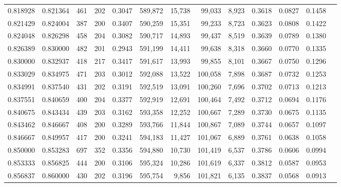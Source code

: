 \begin{tabular}{rrrrrrrrrrrrr}
0.818928 & 0.821364 &    461 &   202 &                                     0.3047 & 589,872 &  15,738 &  99,033 &   8,923 & 0.3618 & 0.0827 & 0.1458 \\
0.821429 & 0.824004 &    387 &   200 &                                     0.3407 & 590,259 &  15,351 &  99,233 &   8,723 & 0.3623 & 0.0808 & 0.1422 \\
0.824048 & 0.826298 &    458 &   204 &                                     0.3082 & 590,717 &  14,893 &  99,437 &   8,519 & 0.3639 & 0.0789 & 0.1380 \\
0.826389 & 0.830000 &    482 &   201 &                                     0.2943 & 591,199 &  14,411 &  99,638 &   8,318 & 0.3660 & 0.0770 & 0.1335 \\
0.830000 & 0.832937 &    418 &   217 &                                     0.3417 & 591,617 &  13,993 &  99,855 &   8,101 & 0.3667 & 0.0750 & 0.1296 \\
0.833029 & 0.834975 &    471 &   203 &                                     0.3012 & 592,088 &  13,522 & 100,058 &   7,898 & 0.3687 & 0.0732 & 0.1253 \\
0.834991 & 0.837540 &    431 &   202 &                                     0.3191 & 592,519 &  13,091 & 100,260 &   7,696 & 0.3702 & 0.0713 & 0.1213 \\
0.837551 & 0.840659 &    400 &   204 &                                     0.3377 & 592,919 &  12,691 & 100,464 &   7,492 & 0.3712 & 0.0694 & 0.1176 \\
0.840675 & 0.843434 &    439 &   203 &                                     0.3162 & 593,358 &  12,252 & 100,667 &   7,289 & 0.3730 & 0.0675 & 0.1135 \\
0.843462 & 0.846667 &    408 &   200 &                                     0.3289 & 593,766 &  11,844 & 100,867 &   7,089 & 0.3744 & 0.0657 & 0.1097 \\
0.846667 & 0.849957 &    417 &   200 &                                     0.3241 & 594,183 &  11,427 & 101,067 &   6,889 & 0.3761 & 0.0638 & 0.1058 \\
0.850000 & 0.853283 &    697 &   352 &                                     0.3356 & 594,880 &  10,730 & 101,419 &   6,537 & 0.3786 & 0.0606 & 0.0994 \\
0.853333 & 0.856825 &    444 &   200 &                                     0.3106 & 595,324 &  10,286 & 101,619 &   6,337 & 0.3812 & 0.0587 & 0.0953 \\
0.856837 & 0.860000 &    430 &   202 &                                     0.3196 & 595,754 &   9,856 & 101,821 &   6,135 & 0.3837 & 0.0568 & 0.0913 \\

\end{tabular}
